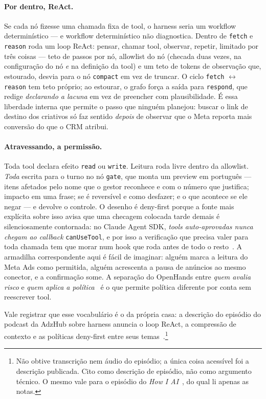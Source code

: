 \documentclass[10pt,twocolumn]{article}
\newcommand{\code}[1]{\texttt{\footnotesize #1}}
\begin{document}
\paragraph{Por dentro, ReAct.} Se cada nó fizesse uma chamada fixa de tool, o harness seria
um workflow determinístico --- e workflow determinístico não diagnostica. Dentro de
\code{fetch} e \code{reason} roda um loop ReAct: pensar, chamar tool, observar, repetir,
limitado por três coisas --- teto de passos por nó, allowlist do nó (checada duas vezes, na
configuração do nó \emph{e} na definição da tool) e um teto de tokens de observação que,
estourado, desvia para o nó \code{compact} em vez de truncar. O ciclo \code{fetch}
$\leftrightarrow$ \code{reason} tem teto próprio; ao estourar, o grafo força a saída para
\code{respond}, que redige \emph{declarando a lacuna} em vez de preencher com
plausibilidade. É essa liberdade interna que permite o passo que ninguém planejou: buscar o
link de destino dos criativos só faz sentido \emph{depois} de observar que o Meta reporta
mais conversão do que o CRM atribui.

\paragraph{Atravessando, a permissão.} Toda tool declara efeito \code{read} ou
\code{write}. Leitura roda livre dentro da allowlist. \emph{Toda} escrita para o turno no nó
\code{gate}, que monta um preview em português --- itens afetados pelo nome que o gestor
reconhece e com o número que justifica; impacto em uma frase; se é reversível e como
desfazer; e o que acontece se ele negar --- e devolve o controle. O desenho é deny-first
porque a fonte mais explícita sobre isso avisa que uma checagem colocada tarde demais é
silenciosamente contornada: no Claude Agent SDK, \emph{tools auto-aprovadas nunca chegam ao
callback} \code{canUseTool}, e por isso a verificação que precisa valer para toda chamada
tem que morar num hook que roda antes de todo o resto~\cite{anthropic2026permissions}. A
armadilha correspondente aqui é fácil de imaginar: alguém marca a leitura do Meta Ads como
permitida, alguém acrescenta a pausa de anúncios ao mesmo conector, e a confirmação some. A
separação do OpenHands entre \emph{quem avalia risco} e \emph{quem aplica a
política}~\cite{wang2026openhands} é o que permite política diferente por conta sem
reescrever tool.

Vale registrar que esse vocabulário é o da própria casa: a descrição do episódio do podcast
da AdzHub sobre harness anuncia o loop ReAct, a compressão de contexto e as políticas
deny-first entre seus temas~\cite{adzhub2026harness}.\footnote{Não obtive transcrição nem
áudio do episódio; a única coisa acessível foi a descrição publicada. Cito como descrição de
episódio, não como argumento técnico. O mesmo vale para o episódio do \emph{How I
AI}~\cite{vo2026harness}, do qual li apenas as notas.}
\end{document}
